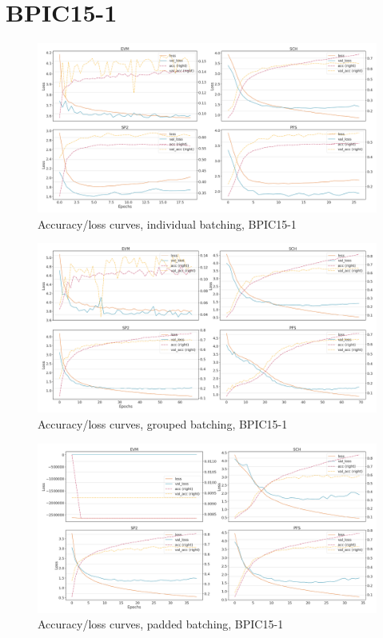 \section*{BPIC15-1}
\begin{figure}[!htb]
    \centering
    \includegraphics[width=\textwidth]{gfx/bpic2015_1/individual_loss_acc_curve.png}
    \caption{Accuracy/loss curves, individual batching, BPIC15-1}
\end{figure}
\begin{figure}[!htb]
    \centering
    \includegraphics[width=\textwidth]{gfx/bpic2015_1/grouped_loss_acc_curve.png}
    \caption{Accuracy/loss curves, grouped batching, BPIC15-1}
\end{figure}
\begin{figure}[!htb]
    \centering
    \includegraphics[width=\textwidth]{gfx/bpic2015_1/padded_loss_acc_curve.png}
    \caption{Accuracy/loss curves, padded batching, BPIC15-1}
\end{figure}
